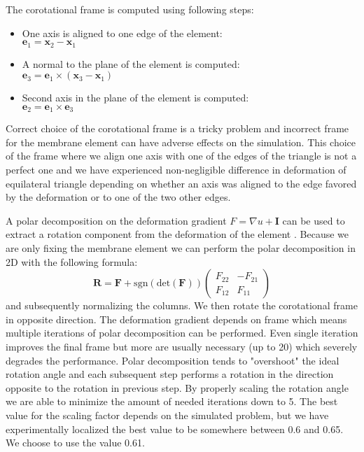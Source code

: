 \documentclass{egpubl}
\newcommand{\mat}[1]{\mathbf{#1}}
\begin{document}
The corotational frame is computed using following steps: 

\begin{itemize}
    \item One axis is aligned to one edge of the element:\\
    $\mathbf{e}_1 = \mathbf{x}_2 - \mathbf{x}_1$
    \item A normal to the plane of the element is computed:\\
    $\mathbf{e}_3 = \mathbf{e}_1 \times (\mathbf{x}_3 - \mathbf{x}_1)$
    \item Second axis in the plane of the element is computed:\\
    $\mathbf{e}_2 = \mathbf{e}_1 \times \mathbf{e}_3$
\end{itemize}

Correct choice of the corotational frame is a tricky
problem \cite{Felippa2005} and incorrect frame for the membrane element can
have adverse effects on the simulation.
This choice of the frame where we align one axis with one of the edges
of the triangle is not a perfect one and we have experienced
non-negligible difference in deformation of equilateral triangle depending
on whether an axis was aligned to the edge favored by the deformation or to
one of the two other edges.

A polar decomposition on the deformation gradient $F = \nabla u
+ \mat{I}$ can be used to extract a rotation component from the deformation of
the element \cite{Ciarlet1994,Hauth2004}. Because we are only fixing the membrane
element we can perform the polar decomposition in 2D with the following
formula:
%
\begin{equation}
    \mat{R} = \mat{F} + \mathrm{sgn}(\mathrm{det}(\mat{F})) \begin{pmatrix}
        F_{22} & - F_{21} \\
        F_{12} & F_{11}
    \end{pmatrix}
\end{equation}
%
and subsequently normalizing the columns. We then rotate the corotational
frame in opposite direction.
The deformation gradient depends on frame which means multiple iterations of polar decomposition can be performed.
Even single iteration improves the
final frame but more are usually
necessary (up to 20) which severely degrades the performance. Polar
decomposition tends to "overshoot" the ideal rotation angle and each
subsequent step performs a rotation in the direction opposite to the rotation in previous step. By properly
scaling the rotation angle we are able to minimize the amount of needed
iterations down to 5. The best value for the scaling factor depends on the
simulated problem, but we have experimentally localized the best value to
be somewhere between 0.6 and 0.65. We choose to use the value 0.61.
\end{document}
